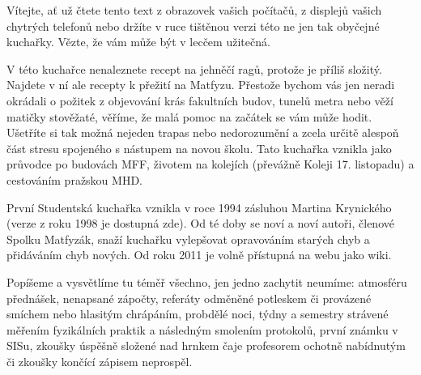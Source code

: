 Vítejte, ať už čtete tento text z obrazovek vašich počítačů,
z displejů vašich chytrých telefonů nebo držíte v ruce tištěnou verzi této ne
jen tak obyčejné kuchařky. Vězte, že vám může být v lecčem užitečná.


V této kuchařce nenaleznete recept na jehněčí ragů, protože je příliš složitý.
Najdete v ní ale recepty k přežití na Matfyzu.
Přestože bychom vás jen neradi okrádali o požitek z objevování krás
fakultních budov, tunelů metra nebo věží matičky stověžaté, věříme,
že malá pomoc na začátek se vám může hodit.
Ušetříte si tak možná nejeden trapas nebo nedorozumění a zcela určitě
alespoň část stresu spojeného s nástupem na novou školu.
Tato kuchařka vznikla jako průvodce po budovách MFF,
životem na kolejích (převážně Koleji 17. listopadu) a cestováním pražskou MHD.


První Studentská kuchařka vznikla v roce 1994 zásluhou Martina Krynického
(verze z roku 1998 je dostupná zde).
Od té doby se noví a noví autoři, členové Spolku Matfyzák,
snaží kuchařku vylepšovat opravováním starých chyb a přidáváním chyb nových.
Od roku 2011 je volně přístupná na webu jako wiki.


Popíšeme a vysvětlíme tu téměř všechno, jen jedno zachytit neumíme:
atmosféru přednášek, nenapsané zápočty, referáty odměněné potleskem
či provázené smíchem nebo hlasitým chrápáním, probdělé noci,
týdny a semestry strávené měřením fyzikálních praktik a následným
smolením protokolů, první známku v SISu, zkoušky úspěšně složené
nad hrnkem čaje profesorem ochotně nabídnutým či zkoušky končící
zápisem neprospěl.